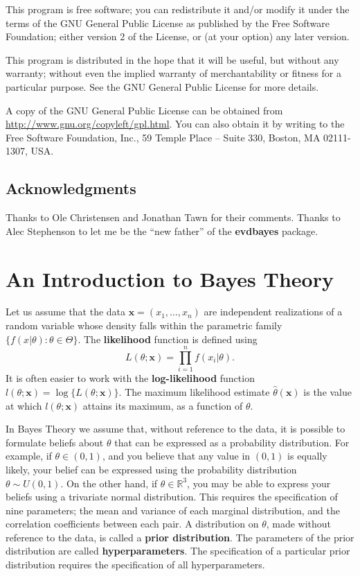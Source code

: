 \documentclass[11pt,a4paper]{article}
\newcommand{\bs}{\boldsymbol}
\begin{document}
This program is free software; you can redistribute it and/or modify
it under the terms of the GNU General Public License as published by
the Free Software Foundation; either version 2 of the License, or (at
your option) any later version.

This program is distributed in the hope that it will be useful, but
without any warranty; without even the implied warranty of
merchantability or fitness for a particular purpose.  See the GNU
General Public License for more details.

A copy of the GNU General Public License can be obtained from
\url{http://www.gnu.org/copyleft/gpl.html}.  You can also obtain it by
writing to the Free Software Foundation, Inc., 59 Temple Place --
Suite 330, Boston, MA 02111-1307, USA.

\subsection{Acknowledgments}

Thanks to Ole Christensen and Jonathan Tawn for their comments. Thanks
to Alec Stephenson to let me be the ``new father'' of the
\textbf{evdbayes} package.

\section{An Introduction to Bayes Theory}
\setcounter{footnote}{0}
\label{bayes}

Let us assume that the data $\bs{x} = (x_1,\dots,x_n)$ are independent
realizations of a random variable whose density falls within the
parametric family $\{f(x|\theta):\theta \in \Theta\}$.  The
\textbf{likelihood} function is defined using
\begin{equation*}
L(\theta;\bs{x}) = \prod_{i=1}^n f(x_i|\theta).
\end{equation*} 
It is often easier to work with the \textbf{log-likelihood} function
$l(\theta;\bs{x}) = \log\{L(\theta;\bs{x})\}$.  The maximum likelihood
estimate $\hat{\theta}(\bs{x})$ is the value at which
$l(\theta;\bs{x})$ attains its maximum, as a function of $\theta$.


In Bayes Theory we assume that, without reference to the data, it is
possible to formulate beliefs about $\theta$ that can be expressed as
a probability distribution.  For example, if $\theta \in (0,1)$, and
you believe that any value in $(0,1)$ is equally likely, your belief
can be expressed using the probability distribution $\theta \sim
U(0,1)$.  On the other hand, if $\theta \in \mathbb{R}^3$, you may be
able to express your beliefs using a trivariate normal distribution.
This requires the specification of nine parameters; the mean and
variance of each marginal distribution, and the correlation
coefficients between each pair.  A distribution on $\theta$, made
without reference to the data, is called a \textbf{prior
  distribution}.  The parameters of the prior distribution are called
\textbf{hyperparameters}.  The specification of a particular prior
distribution requires the specification of all hyperparameters.
\end{document}
